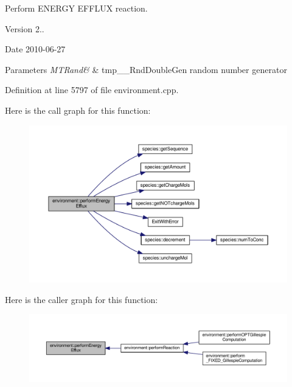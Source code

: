 Perform E\-N\-E\-R\-G\-Y E\-F\-F\-L\-U\-X reaction. 

\begin{DoxyVersion}{Version}
2.. 
\end{DoxyVersion}
\begin{DoxyDate}{Date}
2010-\/06-\/27 
\end{DoxyDate}

\begin{DoxyParams}{Parameters}
{\em M\-T\-Rand\&} & tmp\-\_\-\-\_\-\-Rnd\-Double\-Gen random number generator \\
\hline
\end{DoxyParams}


Definition at line 5797 of file environment.\-cpp.



Here is the call graph for this function\-:\nopagebreak
\begin{figure}[H]
\begin{center}
\leavevmode
\includegraphics[width=350pt]{a00003_aff7607e0f3a74790109a7d87de3031bd_cgraph}
\end{center}
\end{figure}




Here is the caller graph for this function\-:\nopagebreak
\begin{figure}[H]
\begin{center}
\leavevmode
\includegraphics[width=350pt]{a00003_aff7607e0f3a74790109a7d87de3031bd_icgraph}
\end{center}
\end{figure}


